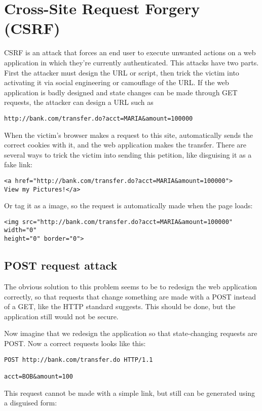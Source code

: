 \section{Cross-Site Request Forgery (CSRF)}
CSRF is an attack that forces an end user to execute unwanted actions on a web application in which they're currently authenticated. This attacks have two parts. First the attacker must design the URL or script, then trick the victim into activating it via social engineering or camouflage of the URL. If the web application is badly designed and state changes can be made through GET requests, the attacker can design a URL such as

\begin{lstlisting}[style=verbs]
http://bank.com/transfer.do?acct=MARIA&amount=100000
\end{lstlisting}
When the victim's browser makes a request to this site, automatically sends the correct cookies with it, and the web application makes the transfer. There are several ways to trick the victim into sending this petition, like disguising it as a fake link: 

\begin{lstlisting}[style=verbs]
<a href="http://bank.com/transfer.do?acct=MARIA&amount=100000">
View my Pictures!</a>
\end{lstlisting}
Or tag it as a image, so the request is automatically made when the page loads:
\begin{lstlisting}[style=verbs]
<img src="http://bank.com/transfer.do?acct=MARIA&amount=100000" width="0" 
height="0" border="0">
\end{lstlisting} 

\subsection{POST request attack}
The obvious solution to this problem seems to be to redesign the web application correctly, so that requests that change something are made with a POST instead of a GET, like the HTTP standard suggests. This should be done, but the application still would not be secure.


Now imagine that we redesign the application so that state-changing requests are POST. Now a correct requests looks like this:
\begin{lstlisting}[style=verbs]
POST http://bank.com/transfer.do HTTP/1.1

acct=BOB&amount=100
\end{lstlisting}
This request cannot be made with a simple link, but still can be generated using a disguised form:

